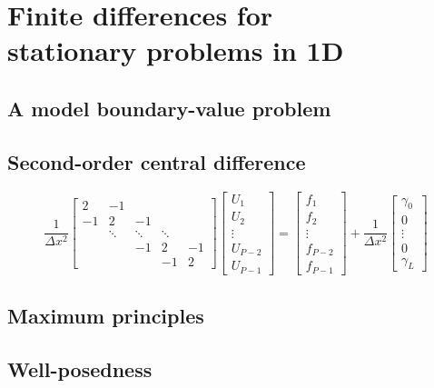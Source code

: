 \chapter[Finite differences in 1D]{Finite differences for \\ 
stationary problems in 1D}

\section{A model boundary-value problem}

\section{Second-order central difference}
\begin{equation}\label{eq: model 1D linear system}
\frac{1}{\Delta x^2}\begin{bmatrix}
 2&    -1&      &      &\\
-1&     2&    -1&      &\\
  &\ddots&\ddots&\ddots&\\
  &      &    -1&     2&-1\\
  &      &      &    -1& 2
\end{bmatrix}
\begin{bmatrix}U_1\\ U_2\\ \vdots\\ U_{P-2}\\ U_{P-1} \end{bmatrix}
=\begin{bmatrix}f_1\\ f_2\\ \vdots\\ f_{P-2}\\ f_{P-1} \end{bmatrix}
+\frac{1}{\Delta x^2}
\begin{bmatrix}\gamma_0\\ 0\\ \vdots\\ 0\\ \gamma_L \end{bmatrix}
\end{equation}


\section{Maximum principles}

\section{Well-posedness}

